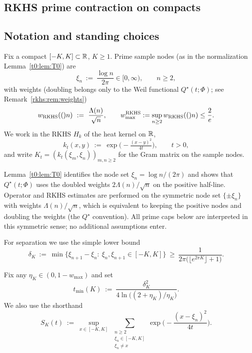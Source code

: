 \subsection{RKHS prime contraction on compacts}\label{sec:rkhs-prime-cap}\label{sec:prime-cap}

\subsection*{Notation and standing choices}
Fix a compact $[-K,K]\subset\mathbb R$, $K\ge1$. Prime sample nodes (as in the normalization Lemma~\ref{t0:lem:T0}) are
\[
\xi_n \ :=\ \frac{\log n}{2\pi}\in[0,\infty),\qquad n\ge2,
\]
with weights (doubling belongs only to the Weil functional $Q^\star(t;\Phi)$; see Remark~\ref{rkhs:rem:weights})
\[
w_{\mathrm{RKHS}}(()n)\ :=\ \frac{\Lambda(n)}{\sqrt{n}},\qquad w_{\max}^{\mathrm{RKHS}}:=\sup_{n\ge2}w_{\mathrm{RKHS}}(()n)\le \frac{2}{e}.
\]
We work in the RKHS $H_k$ of the heat kernel on $\mathbb R$,
\[
k_t(x,y)\ :=\ \exp\!\big(-\tfrac{(x-y)^2}{4t}\big),\qquad t>0,
\]
and write $K_t=(k_t(\xi_m,\xi_n))_{m,n\ge2}$ for the Gram matrix on the sample nodes.


\begin{remark}\label{rkhs:rem:weights}
Lemma~\ref{t0:lem:T0} identifies the node set $\xi_n=\log n/(2\pi)$ and shows that $Q^\star(t;\Phi)$ uses the doubled
weights $2\Lambda(n)/\sqrt n$ on the positive half-line. Operator and RKHS estimates are performed on the
symmetric node set $\{\pm\xi_n\}$ with weights $\Lambda(n)/\sqrt n$, which is equivalent to keeping the
positive nodes and doubling the weights (the $Q^\star$ convention). All prime caps below are interpreted in this symmetric sense; no additional assumptions enter.
\end{remark}
For separation we use the simple lower bound
\begin{equation}\label{eq:deltaK}
\delta_K\ :=\ \min\!\Big\{\xi_{n+1}-\xi_n:\ \xi_n,\xi_{n+1}\in[-K,K]\Big\}
\ \ge\ \frac{1}{2\pi\big(\lfloor e^{2\pi K}\rfloor+1\big)}.
\end{equation}

\begin{remark}\label{rem:params}
Fix any $\eta_K\in(0,1-w_{\max})$ and set
\begin{equation}\label{eq:tmin}
t_{\min}(K)\ :=\ \frac{\delta_K^2}{4\ln\!\big((2+\eta_K)/\eta_K\big)}.
\end{equation}
We also use the shorthand
\[
S_K(t)\ :=\ \sup_{x\in[-K,K]}\ \sum_{\substack{n\ge2\\ \xi_n\in[-K,K] \\ \xi_n\neq x}}
\exp\!\Big(-\frac{(x-\xi_n)^2}{4t}\Big).
\]
\end{remark}

